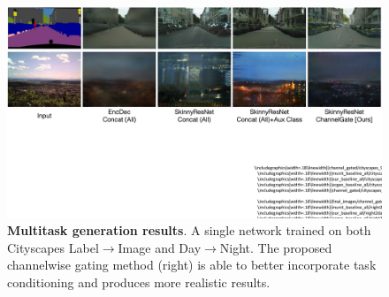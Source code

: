 \documentclass[10pt,twocolumn,letterpaper]{article}
\newcommand{\ow}[1]{\textbf{\textcolor[rgb]{.1, .1, .8}{OW: #1}}}
\begin{document}
\begin{figure}[h]
    \centering
    \includegraphics[width=1.\linewidth]{paper_images/multitask_comp.pdf}
    \caption{\textbf{Multitask generation results}. A single network trained on both Cityscapes Label$\rightarrow$Image and Day$\rightarrow$Night. The proposed channelwise gating method (right) is able to better incorporate task conditioning and produces more realistic results.
    }
    \label{fig:multi-task_day2night}
    \vspace{-2mm}
\end{figure}
\end{document}
